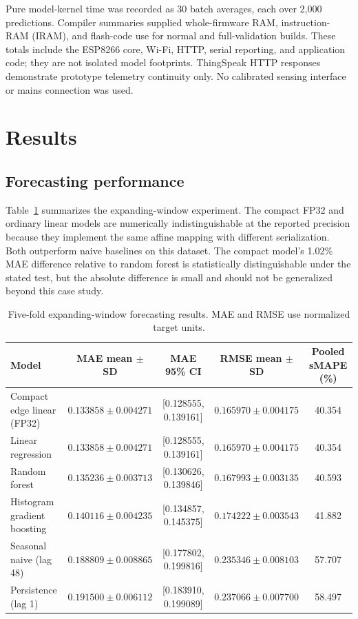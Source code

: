 \documentclass[10pt,a4paper,twocolumn]{article}
\begin{document}
Pure model-kernel time was recorded as 30 batch averages, each over 2,000 predictions. Compiler summaries supplied whole-firmware RAM, instruction-RAM (IRAM), and flash-code use for normal and full-validation builds. These totals include the ESP8266 core, Wi-Fi, HTTP, serial reporting, and application code; they are not isolated model footprints. ThingSpeak HTTP responses demonstrate prototype telemetry continuity only. No calibrated sensing interface or mains connection was used.

\section{Results}
\subsection{Forecasting performance}
Table~\ref{tab:forecasting} summarizes the expanding-window experiment. The compact FP32 and ordinary linear models are numerically indistinguishable at the reported precision because they implement the same affine mapping with different serialization. Both outperform naive baselines on this dataset. The compact model's 1.02\% MAE difference relative to random forest is statistically distinguishable under the stated test, but the absolute difference is small and should not be generalized beyond this case study.

\begin{table}[t]
\centering
\caption{Five-fold expanding-window forecasting results. MAE and RMSE use normalized target units.}
\label{tab:forecasting}
\footnotesize
\begin{tabular}{lcccc}
\toprule
Model & MAE mean $\pm$ SD & MAE 95\% CI & RMSE mean $\pm$ SD & Pooled sMAPE (\%) \\
\midrule
Compact edge linear (FP32) & $0.133858\pm0.004271$ & [0.128555, 0.139161] & $0.165970\pm0.004175$ & 40.354 \\
Linear regression & $0.133858\pm0.004271$ & [0.128555, 0.139161] & $0.165970\pm0.004175$ & 40.354 \\
Random forest & $0.135236\pm0.003713$ & [0.130626, 0.139846] & $0.167993\pm0.003135$ & 40.593 \\
Histogram gradient boosting & $0.140116\pm0.004235$ & [0.134857, 0.145375] & $0.174222\pm0.003543$ & 41.882 \\
Seasonal naive (lag 48) & $0.188809\pm0.008865$ & [0.177802, 0.199816] & $0.235346\pm0.008103$ & 57.707 \\
Persistence (lag 1) & $0.191500\pm0.006112$ & [0.183910, 0.199089] & $0.237066\pm0.007700$ & 58.497 \\
\bottomrule
\end{tabular}
\end{table}
\end{document}
